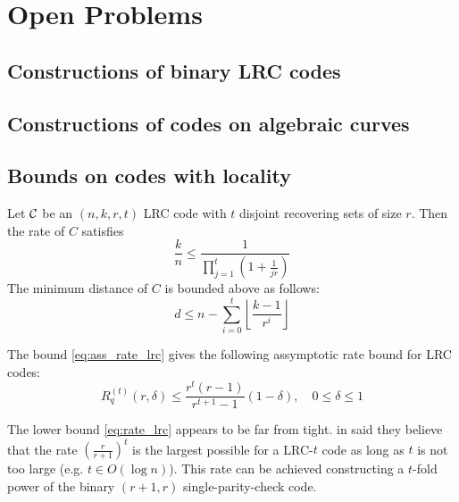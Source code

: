 \chapter{Open Problems}
\cite{MR_LRC}
\section{Constructions of binary LRC codes}
\cite{binary_constructions}

\section{Constructions of codes on algebraic curves}
\cite{LRC_on_alg_curves, LRC_on_alg_curves2, LRC_fibers}

\section{Bounds on codes with locality}
\nocite{combinatorial_bounds}
\nocite{bounds_on_LRC}
\nocite{bounds_on_LRC_t}

\begin{thm}\label{thm:lrc_rate}
Let ${\mathcal C}$ be an $(n,k,r,t)$ LRC code with $t$ disjoint recovering sets of size $r$. Then the rate of $C$ satisfies
\begin{equation}\label{eq:rate_lrc}
\frac{k}{n} \leq \frac{1}{\prod_{j=1}^t(1+\frac{1}{jr})}
\end{equation}
The minimum distance of $C$ is bounded above as follows:
\begin{equation}\label{eq:ass_rate_lrc}
d \leq n - \sum_{i=0}^t \left\lfloor \frac{k-1}{r^i} \right\rfloor
\end{equation}
\end{thm}

The bound \ref{eq:ass_rate_lrc} gives the following assymptotic rate bound for LRC codes:
\begin{equation}
R_q^{(t)}(r,\delta) \leq \frac{r^t(r-1)}{r^{t+1}-1}(1-\delta), \quad 0 \leq \delta \leq 1
\end{equation}

The lower bound \ref{eq:rate_lrc} appears to be far from tight. \citeauthor{bounds_on_LRC_t} in \cite{bounds_on_LRC_t} said they believe that the rate $\left(\frac{r}{r+1}\right)^t$ is the largest possible for a LRC-$t$ code as long as $t$ is not too large (e.g. $t \in O(\log n)$). This rate can be achieved constructing a $t$-fold power of the binary $(r+1,r)$ single-parity-check code.

